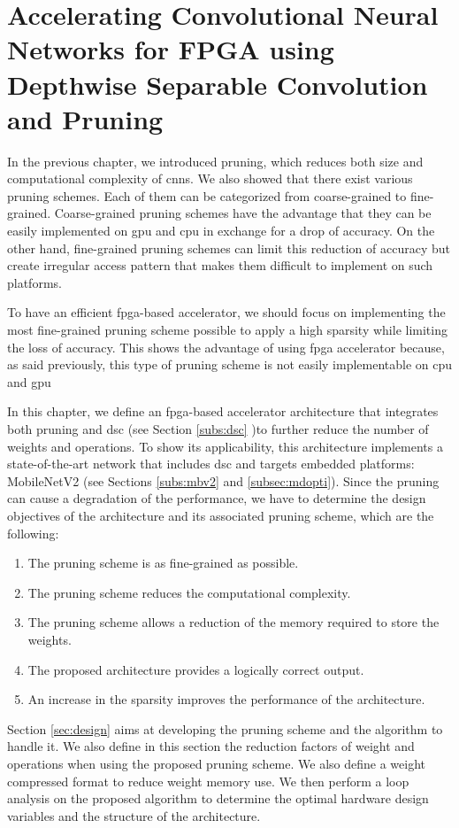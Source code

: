 \chapter{Accelerating Convolutional Neural Networks for FPGA using Depthwise Separable Convolution and Pruning} \label{chap:pratique}
%
%
In the previous chapter, we introduced pruning, which reduces both size and computational complexity of \acrshort{cnn}s. We also showed that there exist various pruning schemes. Each of them can be categorized from coarse-grained to fine-grained. Coarse-grained pruning schemes have the advantage that they can be easily implemented on \acrshort{gpu} and \acrshort{cpu} in exchange for a drop of accuracy. On the other hand, fine-grained pruning schemes can limit this reduction of accuracy but create irregular access pattern that makes them difficult to implement on such platforms. 

To have an efficient \acrshort{fpga}-based accelerator, we should focus on implementing the most fine-grained pruning scheme possible to apply a high sparsity while limiting the loss of accuracy. This shows the advantage of using \acrshort{fpga} accelerator because, as said previously, this type of pruning scheme is not easily implementable on \acrshort{cpu} and \acrshort{gpu}

In this chapter, we define an \acrshort{fpga}-based accelerator architecture that integrates both pruning and \acrshort{dsc} (see Section \ref{subs:dsc} )to further reduce the number of weights and operations. To show its applicability, this architecture implements a state-of-the-art network that includes \acrshort{dsc} and targets embedded platforms: MobileNetV2 (see Sections \ref{subs:mbv2} and \ref{subsec:mdopti}). Since the pruning can cause a degradation of the performance, we have to determine the design objectives of the architecture and its associated pruning scheme, which are the following:
%
\begin{enumerate}
    \item The pruning scheme is as fine-grained as possible.
    \item The pruning scheme reduces the computational complexity.
    \item The pruning scheme allows a reduction of the memory required to store the weights.
    \item The proposed architecture provides a logically correct output.
    \item An increase in the sparsity improves the performance of the architecture.
\end{enumerate}
%
Section \ref{sec:design} aims at developing the pruning scheme and the algorithm to handle it. We also define in this section the reduction factors of weight and operations when using the proposed pruning scheme. We also define a weight compressed format to reduce weight memory use. We then perform a loop analysis on the proposed algorithm to determine the optimal hardware design variables and the structure of the architecture.

